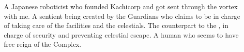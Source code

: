 \documentclass[char]{guardians}
\begin{document}
\begin{contacts}
  \contact{\cKachiko{}} A Japanese roboticist who founded Kachicorp and got sent through the vortex with me.
   A sentient being created by the Guardians who claims to be in charge of taking care of the facilities and the celestials.
   The counterpart to the \cCaretaker{}, in charge of security and preventing celestial escape.
  \contact{\cJascha{\intro}} A human who seems to have free reign of the Complex.
\end{contacts}
\end{document}
